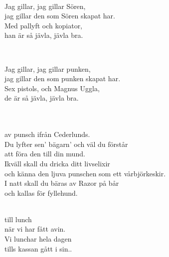 
 \\       

\songtext{}
Jag gillar, jag gillar Sören, \\
jag gillar den som Sören skapat har.  \\
Med pallyft och kopiator, \\
han är så jävla, jävla bra. \\

\newpage


 \\       

\songtext{}
Jag gillar, jag gillar punken, \\
jag gillar den som punken skapat har. \\
Sex pistols, och Magnus Uggla, \\
de är så jävla, jävla bra. \\




 \\       

\\
av punsch ifrån Cederlunds.\\ 
Du lyfter sen' bägarn' och väl du förstår\\ 
att föra den till din mund.\\ 
Ikväll skall du dricka ditt livselixir\\ 
och känna den ljuva punschen som ett vårbjörkeskir.\\ 
I natt skall du bäras av Razor på bår\\ 
och kallas för fyllehund.\\


 \\       

\leftrepeat {}till lunch \\
när vi har fått avin. \\
Vi lunchar hela dagen \\
tills kassan gått i sin.. \rightrepeat

